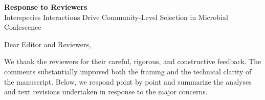 \documentclass[11pt]{article}
\begin{document}
\begin{center}
{\Large \textbf{Response to Reviewers}}\\[0.5em]
{\large Interspecies Interactions Drive Community-Level Selection in Microbial Coalescence}
\end{center}

Dear Editor and Reviewers,

We thank the reviewers for their careful, rigorous, and constructive feedback. The comments substantially improved both the framing and the technical clarity of the manuscript. Below, we respond point by point and summarize the analyses and text revisions undertaken in response to the major concerns.


\clearpage

\clearpage

\end{document}
